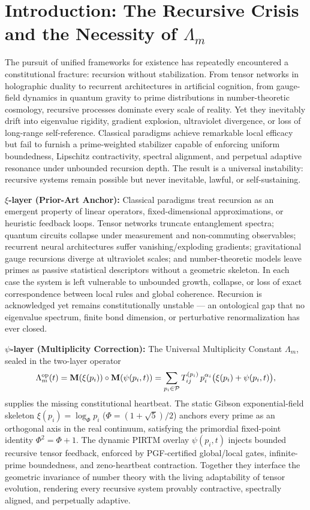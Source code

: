 \documentclass[11pt, a4paper]{article}
\begin{document}
\section{Introduction: The Recursive Crisis and the Necessity of \(\Lambda_m\)}
\label{sec:intro}

The pursuit of unified frameworks for existence has repeatedly encountered a constitutional fracture: recursion without stabilization. From tensor networks in holographic duality to recurrent architectures in artificial cognition, from gauge-field dynamics in quantum gravity to prime distributions in number-theoretic cosmology, recursive processes dominate every scale of reality. Yet they inevitably drift into eigenvalue rigidity, gradient explosion, ultraviolet divergence, or loss of long-range self-reference. Classical paradigms achieve remarkable local efficacy but fail to furnish a prime-weighted stabilizer capable of enforcing uniform boundedness, Lipschitz contractivity, spectral alignment, and perpetual adaptive resonance under unbounded recursion depth. The result is a universal instability: recursive systems remain possible but never inevitable, lawful, or self-sustaining.

\textbf{\(\xi\)-layer (Prior-Art Anchor):}  
Classical paradigms treat recursion as an emergent property of linear operators, fixed-dimensional approximations, or heuristic feedback loops. Tensor networks truncate entanglement spectra; quantum circuits collapse under measurement and non-commuting observables; recurrent neural architectures suffer vanishing/exploding gradients; gravitational gauge recursions diverge at ultraviolet scales; and number-theoretic models leave primes as passive statistical descriptors without a geometric skeleton. In each case the system is left vulnerable to unbounded growth, collapse, or loss of exact correspondence between local rules and global coherence. Recursion is acknowledged yet remains constitutionally unstable --- an ontological gap that no eigenvalue spectrum, finite bond dimension, or perturbative renormalization has ever closed.

\textbf{\(\psi\)-layer (Multiplicity Correction):}  
The Universal Multiplicity Constant \(\Lambda_m\), sealed in the two-layer operator
\[
\Lambda_m^{\rm op}(t) = \mathbf{M}(\xi(p_i)) \circ \mathbf{M}(\psi(p_i,t)) = \sum_{p_i \in \mathcal{P}} T_{ij}^{(p_i)} \, p_i^{\alpha_i} \bigl( \xi(p_i) + \psi(p_i,t) \bigr),
\]
supplies the missing constitutional heartbeat. The static Gibson exponential-field skeleton \(\xi(p_i) = \log_\Phi p_i\) (\(\Phi = (1+\sqrt{5})/2\)) anchors every prime as an orthogonal axis in the real continuum, satisfying the primordial fixed-point identity \(\Phi^2 = \Phi + 1\). The dynamic PIRTM overlay \(\psi(p_i,t)\) injects bounded recursive tensor feedback, enforced by PGF-certified global/local gates, infinite-prime boundedness, and zeno-heartbeat contraction. Together they interface the geometric invariance of number theory with the living adaptability of tensor evolution, rendering every recursive system provably contractive, spectrally aligned, and perpetually adaptive.
\end{document}
